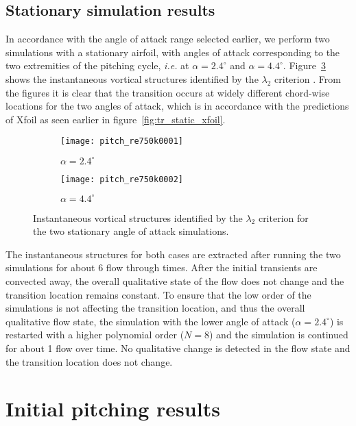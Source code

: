 \subsection{Stationary simulation results}

In accordance with the angle of attack range selected earlier, we perform two simulations with a stationary airfoil, with angles of attack corresponding to the two extremities of the pitching cycle, \textit{i.e.} at $\alpha=2.4^{\circ}$ and $\alpha=4.4^{\circ}$. Figure~\ref{fig:la2_750k_stationary} shows the instantaneous vortical structures identified by the $\lambda_{2}$ criterion \citep{jeong95}. From the figures it is clear that the transition occurs at widely different chord-wise locations for the two angles of attack, which is in accordance with the predictions of Xfoil as seen earlier in figure~\ref{fig:tr_static_xfoil}.
\begin{figure}[h]
	\centering
	\begin{subfigure}[t]{0.9\textwidth}
		\texttt{[image: pitch\_re750k0001]}
		\caption{$\alpha=2.4^{\circ}$}
		\label{fig:la2_aoa24}
	\end{subfigure}
	\begin{subfigure}[t]{0.9\textwidth}
		\texttt{[image: pitch\_re750k0002]}
		\caption{$\alpha=4.4^{\circ}$}
		\label{fig:la2_aoa44}		
	\end{subfigure}	
	\caption{Instantaneous vortical structures identified by the $\lambda_{2}$ criterion for the two stationary angle of attack simulations.}
	\label{fig:la2_750k_stationary}
\end{figure}
The instantaneous structures for both cases are extracted after running the two simulations for about 6 flow through times. After the initial transients are convected away, the overall qualitative state of the flow does not change and the transition location remains constant. To ensure that the low order of the simulations is not affecting the transition location, and thus the overall qualitative flow state, the simulation with the lower angle of attack ($\alpha=2.4^{\circ}$) is restarted with a higher polynomial order ($N=8$) and the simulation is continued for about 1 flow over time. No qualitative change is detected in the flow state and the transition location does not change.

\section{Initial pitching results}

